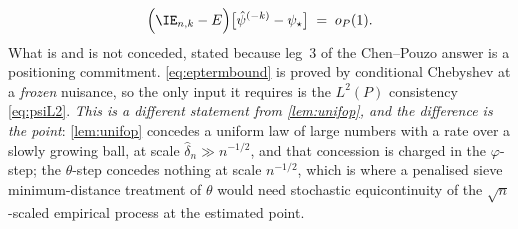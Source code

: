 \begin{lemma}
\begin{equation}
\Big(\IE_{n,k}-E\Big)\big[\hat\psi^{(-k)}-\psi_\star\big]\;=\;o_P(1).
\end{equation}
What is and is not conceded, stated because leg~3 of the Chen--Pouzo answer is a positioning
commitment. \eqref{eq:eptermbound} is proved by conditional Chebyshev at a \emph{frozen} nuisance, so the
only input it requires is the $L^{2}(P)$ consistency \eqref{eq:psiL2}. \emph{This is a different
statement from \cref{lem:unifop}, and the difference is the point}: \cref{lem:unifop} concedes a uniform law
of large numbers with a rate over a slowly growing ball, at scale $\hat\delta_n\gg n^{-1/2}$, and that
concession is charged in the $\varphi$-step; the $\theta$-step concedes nothing at scale $n^{-1/2}$, which is
where a penalised sieve minimum-distance treatment of $\theta$ would need stochastic equicontinuity of the
$\sqrt n$-scaled empirical process at the estimated point.
\end{lemma}

